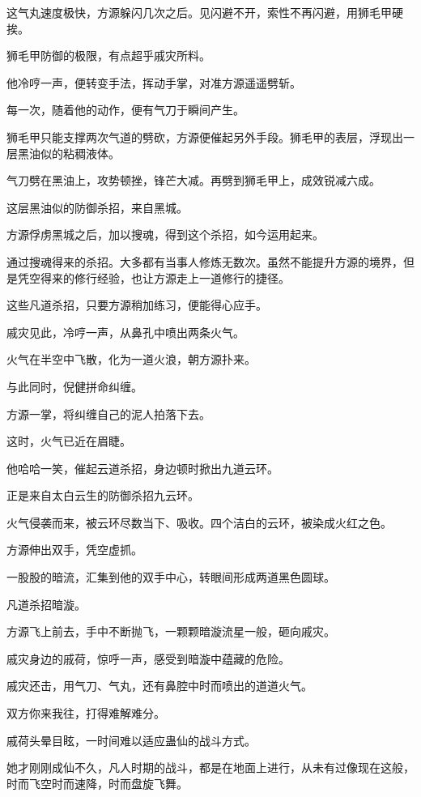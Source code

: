 \begin{this_body}
这气丸速度极快，方源躲闪几次之后。见闪避不开，索性不再闪避，用狮毛甲硬挨。

狮毛甲防御的极限，有点超乎戚灾所料。

他冷哼一声，便转变手法，挥动手掌，对准方源遥遥劈斩。

每一次，随着他的动作，便有气刀于瞬间产生。

狮毛甲只能支撑两次气道的劈砍，方源便催起另外手段。狮毛甲的表层，浮现出一层黑油似的粘稠液体。

气刀劈在黑油上，攻势顿挫，锋芒大减。再劈到狮毛甲上，成效锐减六成。

这层黑油似的防御杀招，来自黑城。

方源俘虏黑城之后，加以搜魂，得到这个杀招，如今运用起来。

通过搜魂得来的杀招。大多都有当事人修炼无数次。虽然不能提升方源的境界，但是凭空得来的修行经验，也让方源走上一道修行的捷径。

这些凡道杀招，只要方源稍加练习，便能得心应手。

戚灾见此，冷哼一声，从鼻孔中喷出两条火气。

火气在半空中飞散，化为一道火浪，朝方源扑来。

与此同时，倪健拼命纠缠。

方源一掌，将纠缠自己的泥人拍落下去。

这时，火气已近在眉睫。

他哈哈一笑，催起云道杀招，身边顿时掀出九道云环。

正是来自太白云生的防御杀招九云环。

火气侵袭而来，被云环尽数当下、吸收。四个洁白的云环，被染成火红之色。

方源伸出双手，凭空虚抓。

一股股的暗流，汇集到他的双手中心，转眼间形成两道黑色圆球。

凡道杀招暗漩。

方源飞上前去，手中不断抛飞，一颗颗暗漩流星一般，砸向戚灾。

戚灾身边的戚荷，惊呼一声，感受到暗漩中蕴藏的危险。

戚灾还击，用气刀、气丸，还有鼻腔中时而喷出的道道火气。

双方你来我往，打得难解难分。

戚荷头晕目眩，一时间难以适应蛊仙的战斗方式。

她才刚刚成仙不久，凡人时期的战斗，都是在地面上进行，从未有过像现在这般，时而飞空时而速降，时而盘旋飞舞。


\end{this_body}
